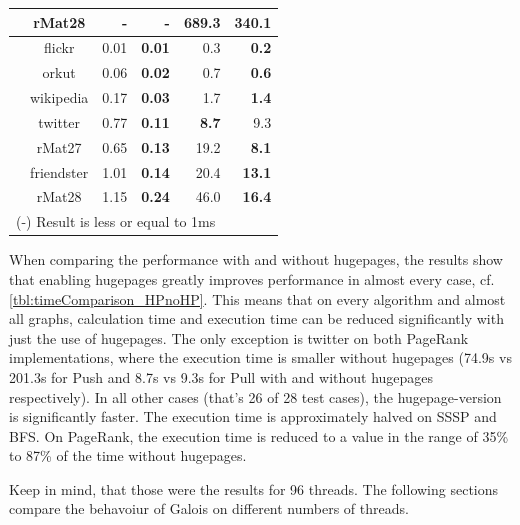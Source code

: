 \begin{table}
\begin{tabular}{ccr@{\tabskip 2 \tabcolsep}rr@{\tabskip 2 \tabcolsep}r}
		& rMat28 & - & - & 689.3 & \bf 340.1 \\
		\midrule
		\multirow{7}{0.5ex}{\rotatebox{90}{\bf PR Pull}}
		& flickr & 0.01 & \bf 0.01 & 0.3 & \bf 0.2 \\
		& orkut & 0.06 & \bf 0.02 & 0.7 & \bf 0.6 \\
		& wikipedia & 0.17 & \bf 0.03 & 1.7 & \bf 1.4 \\
		& twitter & 0.77 & \bf 0.11 & \bf 8.7 & 9.3 \\
		& rMat27 & 0.65 & \bf 0.13 & 19.2 & \bf 8.1 \\
		& friendster & 1.01 & \bf 0.14 & 20.4 & \bf 13.1 \\
		& rMat28 & 1.15 & \bf 0.24 & 46.0 & \bf 16.4 \\
		\bottomrule
		\multicolumn{6}{l}{(-) Result is less or equal to 1ms}
	\end{tabular}
\end{table}
When comparing the performance with and without hugepages, the results show that enabling hugepages greatly improves performance in almost every case, cf. \autoref{tbl:timeComparison_HPnoHP}. This means that on every algorithm and almost all graphs, calculation time and execution time can be reduced significantly with just the use of hugepages. The only exception is twitter on both PageRank implementations, where the execution time is smaller without hugepages (74.9s vs 201.3s for Push and 8.7s vs 9.3s for Pull with and without hugepages respectively). In all other cases (that's 26 of 28 test cases), the hugepage-version is significantly faster.
The execution time is approximately halved on SSSP and BFS. 
On PageRank, the execution time is reduced to a value in the range of 35\% to 87\% of the time without hugepages.

Keep in mind, that those were the results for 96 threads. The following sections compare the behavoiur of Galois on different numbers of threads.

